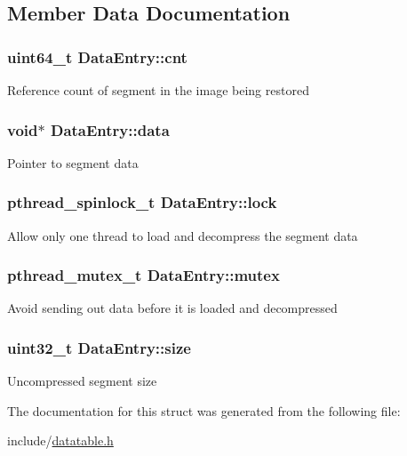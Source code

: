 \subsection{\-Member \-Data \-Documentation}
\hypertarget{structDataEntry_ac370f0b6417e245082350869d6b539c5}{
\subsubsection[{cnt}]{\setlength{\rightskip}{0pt plus 5cm}uint64\-\_\-t {\bf \-Data\-Entry\-::cnt}}}\label{structDataEntry_ac370f0b6417e245082350869d6b539c5}
\-Reference count of segment in the image being restored \hypertarget{structDataEntry_a0260676fd4fea77dee47c1c13cf58368}{
\subsubsection[{data}]{\setlength{\rightskip}{0pt plus 5cm}void$\ast$ {\bf \-Data\-Entry\-::data}}}\label{structDataEntry_a0260676fd4fea77dee47c1c13cf58368}
\-Pointer to segment data \hypertarget{structDataEntry_a5206ede459648d4ad842f373f7585427}{
\subsubsection[{lock}]{\setlength{\rightskip}{0pt plus 5cm}pthread\-\_\-spinlock\-\_\-t {\bf \-Data\-Entry\-::lock}}}\label{structDataEntry_a5206ede459648d4ad842f373f7585427}
\-Allow only one thread to load and decompress the segment data \hypertarget{structDataEntry_ae7bbcaa15d9472be5ea1dad131d0831c}{
\subsubsection[{mutex}]{\setlength{\rightskip}{0pt plus 5cm}pthread\-\_\-mutex\-\_\-t {\bf \-Data\-Entry\-::mutex}}}\label{structDataEntry_ae7bbcaa15d9472be5ea1dad131d0831c}
\-Avoid sending out data before it is loaded and decompressed \hypertarget{structDataEntry_a4020c081bf0b0928ee81b15896b31b8b}{
\subsubsection[{size}]{\setlength{\rightskip}{0pt plus 5cm}uint32\-\_\-t {\bf \-Data\-Entry\-::size}}}\label{structDataEntry_a4020c081bf0b0928ee81b15896b31b8b}
\-Uncompressed segment size 

\-The documentation for this struct was generated from the following file\-:\begin{DoxyCompactItemize}
\item 
include/\hyperlink{datatable_8h}{datatable.\-h}\end{DoxyCompactItemize}

